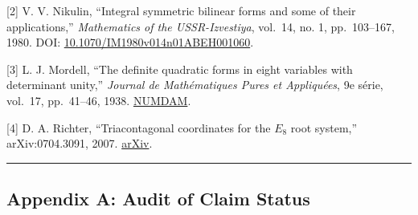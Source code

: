 \documentclass[
  a4paper,
]{article}
\begin{document}
{[}2{]} V. V. Nikulin, ``Integral symmetric bilinear forms and some of
their applications,'' \emph{Mathematics of the USSR-Izvestiya}, vol.~14,
no. 1, pp.~103--167, 1980. DOI:
\href{https://doi.org/10.1070/IM1980v014n01ABEH001060}{10.1070/IM1980v014n01ABEH001060}.

{[}3{]} L. J. Mordell, ``The definite quadratic forms in eight variables
with determinant unity,'' \emph{Journal de Mathématiques Pures et
Appliquées}, 9e série, vol.~17, pp.~41--46, 1938.
\href{https://www.numdam.org/item/JMPA_1938_9_17_1-4_41_0/}{NUMDAM}.

{[}4{]} D. A. Richter, ``Triacontagonal coordinates for the \(E_8\) root
system,'' arXiv:0704.3091, 2007.
\href{https://arxiv.org/abs/0704.3091}{arXiv}.

\begin{center}\rule{0.5\linewidth}{0.5pt}\end{center}

\subsection{Appendix A: Audit of Claim
Status}\label{appendix-a-audit-of-claim-status}
\end{document}
